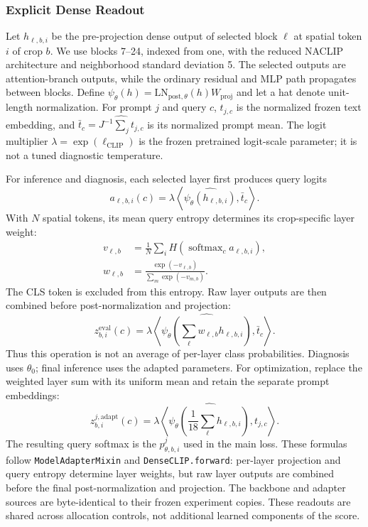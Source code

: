 \subsubsection{Explicit Dense Readout}
\label{app:readout}
Let $h_{\ell,b,i}$ be the pre-projection dense output of selected block $\ell$ at spatial token $i$ of crop $b$. We use blocks 7--24, indexed from one, with the reduced NACLIP architecture and neighborhood standard deviation 5. The selected outputs are attention-branch outputs, while the ordinary residual and MLP path propagates between blocks. Define $\psi_\theta(h)=\mathrm{LN}_{\mathrm{post},\theta}(h)W_{\mathrm{proj}}$ and let a hat denote unit-length normalization. For prompt $j$ and query $c$, $t_{j,c}$ is the normalized frozen text embedding, and $\bar t_c=\widehat{J^{-1}\sum_j t_{j,c}}$ is its normalized prompt mean. The logit multiplier $\lambda=\exp(\ell_{\mathrm{CLIP}})$ is the frozen pretrained logit-scale parameter; it is not a tuned diagnostic temperature.

For inference and diagnosis, each selected layer first produces query logits
\begin{equation}
a_{\ell,b,i}(c)=\lambda\left\langle
\widehat{\psi_\theta(h_{\ell,b,i})},\bar t_c\right\rangle.
\end{equation}
With $N$ spatial tokens, its mean query entropy determines its crop-specific layer weight:
\begin{align}
v_{\ell,b}&=\frac1N\sum_i H\!\left(\operatorname{softmax}_c a_{\ell,b,i}\right),\\
w_{\ell,b}&=\frac{\exp(-v_{\ell,b})}{\sum_m\exp(-v_{m,b})}.
\end{align}
The CLS token is excluded from this entropy. Raw layer outputs are then combined before post-normalization and projection:
\begin{equation}
z^{\mathrm{eval}}_{b,i}(c)=\lambda\left\langle
\widehat{\psi_\theta\!\left(\sum_\ell w_{\ell,b}h_{\ell,b,i}\right)},\bar t_c\right\rangle.
\end{equation}
Thus this operation is not an average of per-layer class probabilities. Diagnosis uses $\theta_0$; final inference uses the adapted parameters. For optimization, replace the weighted layer sum with its uniform mean and retain the separate prompt embeddings:
\begin{equation}
z^{j,\mathrm{adapt}}_{b,i}(c)=\lambda\left\langle
\widehat{\psi_\theta\!\left(\frac1{18}\sum_\ell h_{\ell,b,i}\right)},t_{j,c}\right\rangle.
\end{equation}
The resulting query softmax is the $p^j_{\theta,b,i}$ used in the main loss. These formulas follow \texttt{ModelAdapterMixin} and \texttt{DenseCLIP.forward}: per-layer projection and query entropy determine layer weights, but raw layer outputs are combined before the final post-normalization and projection. The backbone and adapter sources are byte-identical to their frozen experiment copies. These readouts are shared across allocation controls, not additional learned components of the score.

